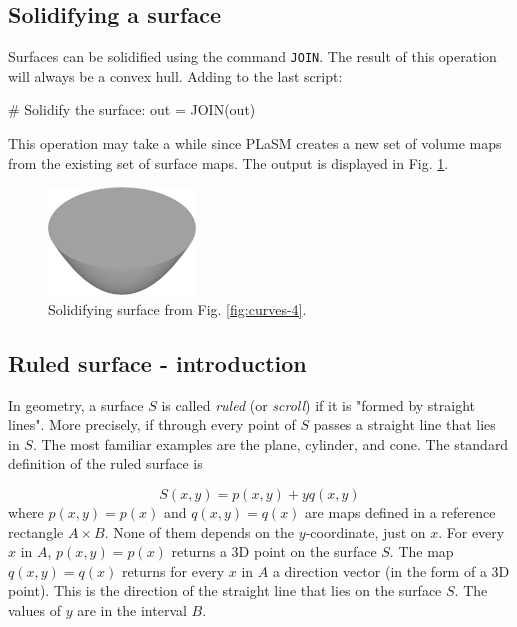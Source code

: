 \subsection{Solidifying a surface}

Surfaces can be solidified using the command {\tt JOIN}. The 
result of this operation will always be a convex hull. 
Adding to the last script:

\begin{bluecode}
# Solidify the surface:
out = JOIN(out)
\end{bluecode}
This operation may take a while since PLaSM creates a new 
set of volume maps from the existing set of surface maps. 
The output is displayed in Fig. \ref{fig:curves-5}.

\begin{figure}[!ht]
\begin{center}
\includegraphics[width=0.35\textwidth]{img/curves-5.png}
\end{center}
\vspace{-4mm}
\caption{Solidifying surface from Fig. \ref{fig:curves-4}.}
\label{fig:curves-5}
\vspace{-1cm}
\end{figure}
\newpage

\subsection{Ruled surface - introduction}

In geometry, a surface $S$ is called {\em ruled} (or {\em scroll}) if it is "formed by straight lines".
More precisely, if through every point of $S$ passes a straight line that lies in $S$. 
The most familiar examples are the plane, cylinder, and 
cone. The standard definition of the ruled surface is 

$$
S(x, y) = p(x, y) + yq(x, y)
$$
where $p(x, y) = p(x)$ and $q(x, y) = q(x)$ are maps defined in a reference rectangle 
$A \times B$. None of them depends on the $y$-coordinate, just on $x$. For every $x$ in 
$A$, $p(x, y) = p(x)$ returns a 3D point on the surface $S$. The map $q(x, y) = q(x)$ returns 
for every $x$ in $A$ a direction vector (in the form of a 3D point). This is the direction 
of the straight line that lies on the surface $S$. The values of $y$ are in the interval $B$.

